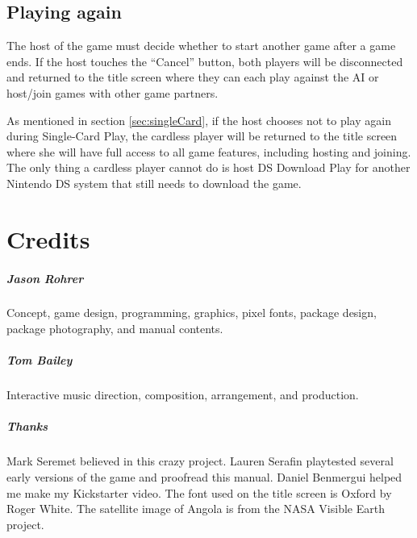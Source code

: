 \documentclass[8pt]{extbook}
\makeatletter
\newcommand{\startopenany}{\@openrightfalse}
\makeatother
\begin{document}
\section{Playing again}
The host of the game must decide whether to start another game after a game ends.  If the host touches the ``Cancel'' button, both players will be disconnected and returned to the title screen where they can each play against the AI or host/join games with other game partners.

As mentioned in section \ref{sec:singleCard}, if the host chooses not to play again during Single-Card Play, the cardless player will be returned to the title screen where she will have full access to all game features, including hosting and joining.  The only thing a cardless player cannot do is host DS Download Play for another Nintendo DS system that still needs to download the game.



\startopenany
\chapter*{Credits}

\paragraph{Jason Rohrer}
Concept, game design, programming, graphics, pixel fonts, package design, package photography, and manual contents.

\paragraph{Tom Bailey}
Interactive music direction, composition, arrangement, and production.

\paragraph{Thanks}
Mark Seremet believed in this crazy project.  Lauren Serafin playtested several early versions of the game and proofread this manual.  Daniel Benmergui helped me make my Kickstarter video.  The font used on the title screen is Oxford by Roger White.  The satellite image of Angola is from the NASA Visible Earth project.
\newpage
\end{document}
